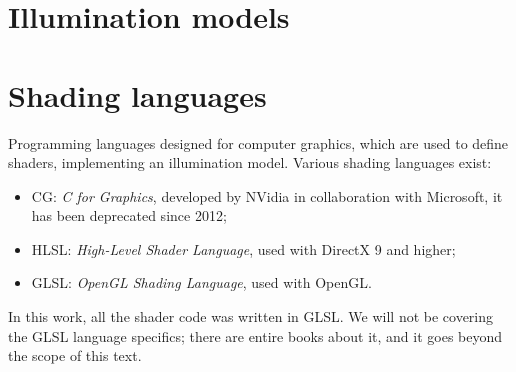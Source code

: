 \section{Illumination models}


\section{Shading languages}
Programming languages designed for computer graphics, which are used to define shaders, implementing an illumination model. Various shading languages exist:

\begin{itemize}
    \item CG: \emph{C for Graphics}, developed by NVidia in collaboration with Microsoft, it has been deprecated since 2012;
    \item HLSL: \emph{High-Level Shader Language}, used with DirectX 9 and higher;
    \item GLSL: \emph{OpenGL Shading Language}, used with OpenGL.
\end{itemize}

In this work, all the shader code was written in GLSL. We will not be covering the GLSL language specifics; there are entire books about it, and it goes beyond the scope of this text.

